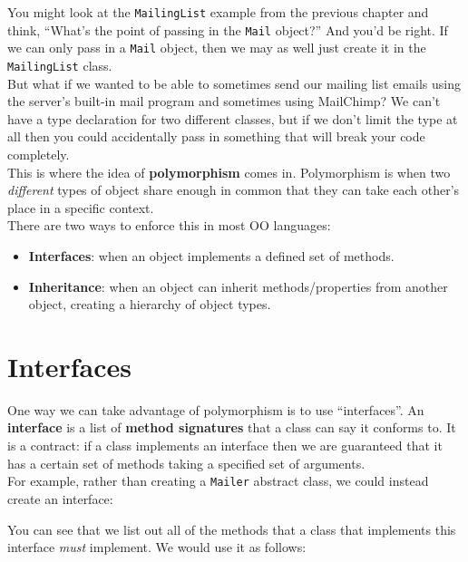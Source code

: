 You might look at the \texttt{MailingList} example from the previous chapter and think, ``What's the point of passing in the \texttt{Mail} object?'' And you'd be right. If we can only pass in a \texttt{Mail} object, then we may as well just create it in the \texttt{MailingList} class.
\\

But what if we wanted to be able to sometimes send our mailing list emails using the server's built-in mail program and sometimes using MailChimp? We can't have a type declaration for two different classes, but if we don't limit the type at all then you could accidentally pass in something that will break your code completely.
\\

This is where the idea of \textbf{polymorphism} comes in. Polymorphism is when two \textit{different} types of object share enough in common that they can take each other's place in a specific context.
\\

There are two ways to enforce this in most OO languages:

\begin{itemize}
    \item \textbf{Interfaces}: when an object implements a defined set of methods.
    \item \textbf{Inheritance}: when an object can inherit methods/properties from another object, creating a hierarchy of object types.
\end{itemize}



\section{Interfaces}

One way we can take advantage of polymorphism is to use ``interfaces''. An \textbf{interface} is a list of \textbf{method signatures} that a class can say it conforms to. It is a contract: if a class implements an interface then we are guaranteed that it has a certain set of methods taking a specified set of arguments.
\\

For example, rather than creating a \texttt{Mailer} abstract class, we could instead create an interface:


You can see that we list out all of the methods that a class that implements this interface \textit{must} implement. We would use it as follows:

